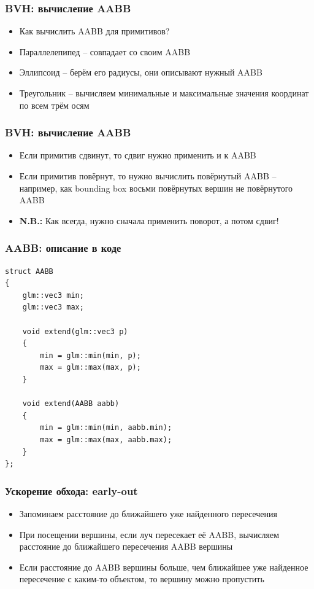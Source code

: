 \documentclass[10pt]{beamer}
\begin{document}
\begin{frame}[fragile]
\frametitle{BVH: вычисление AABB}
\begin{itemize}
\item Как вычислить AABB для примитивов?
\pause
\item Параллелепипед -- совпадает со своим AABB
\pause
\item Эллипсоид -- берём его радиусы, они описывают нужный AABB
\pause
\item Треугольник -- вычисляем минимальные и максимальные значения координат по всем трём осям
\end{itemize}
\end{frame}

\begin{frame}[fragile]
\frametitle{BVH: вычисление AABB}
\begin{itemize}
\item Если примитив сдвинут, то сдвиг нужно применить и к AABB
\pause
\item Если примитив повёрнут, то нужно вычислить повёрнутый AABB -- например, как bounding box восьми повёрнутых вершин не повёрнутого AABB
\pause
\item \textbf{\alert{N.B.:}} Как всегда, нужно сначала применить поворот, а потом сдвиг!
\end{itemize}
\end{frame}

\begin{frame}[fragile]
\frametitle{AABB: описание в коде}
\begin{verbatim}
struct AABB
{
    glm::vec3 min;
    glm::vec3 max;

    void extend(glm::vec3 p)
    {
        min = glm::min(min, p);
        max = glm::max(max, p);
    }

    void extend(AABB aabb)
    {
        min = glm::min(min, aabb.min);
        max = glm::max(max, aabb.max);
    }
};
\end{verbatim}
\end{frame}

\begin{frame}[fragile]
\frametitle{Ускорение обхода: early-out}
\begin{itemize}
\item Запоминаем расстояние до ближайшего уже найденного пересечения
\pause
\item При посещении вершины, если луч пересекает её AABB, вычисляем расстояние до ближайшего пересечения AABB вершины
\pause
\item Если расстояние до AABB вершины больше, чем ближайшее уже найденное пересечение с каким-то объектом, то вершину можно пропустить
\end{itemize}
\end{frame}
\end{document}
